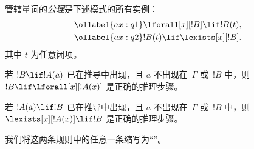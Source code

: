 \documentclass[../../../include/open-logic-section]{subfiles}
\begin{document}


\begin{defn}[量词公理]
管辖量词的\emph{公理}是下述模式的所有实例：
\begin{align}
\ollabel{ax:q1} & \lforall[x][!B] \lif !B(t), \\
\ollabel{ax:q2} & !B(t) \lif \lexists[x][!B].
\end{align}
其中 $t$ 为任意闭项。
\end{defn}

\begin{defn}[量词规则]
\item 若 $!B \lif !A(a)$ 已在推导中出现，且 $a$ 不出现在~$\Gamma$ 或~$!B$ 中，则 $!B \lif
  \lforall[x][!A(x)]$ 是正确的推理步骤。
\item 若 $!A(a) \lif !B$ 已在推导中出现，且 $a$ 不出现在~$\Gamma$ 或~$!B$ 中，则 $\lexists[x][!A(x)] \lif
  !B$ 是正确的推理步骤。
\end{defn}

我们将这两条规则中的任意一条缩写为“\QR”。
\end{document}
